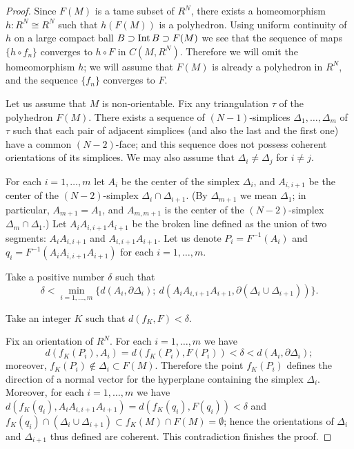 \documentclass[12pt]{article}
\theoremstyle{definition}
\begin{document}
\begin{proof}
Since $F(M)$ is a tame subset of $R^N$,
there exists a homeomorphism $h:R^N\cong R^N$
such that $h(F(M))$ is a polyhedron.
Using uniform
continuity
of $h$ on a large compact ball 
$B\supset \operatorname{Int} B \supset F(M)$
we see
that the sequence of maps
$\{h\circ f_n\}$ converges to
$h\circ F$ in $C(M, R^N)$.
Therefore we will omit the homeomorphism $h$;
we will assume that $F(M)$ is already a polyhedron in $R^N$,
and the sequence 
$\{ f_n\}$ converges to $F$.


Let us assume that $M$ is non-orientable.
Fix any triangulation $\tau $ of the polyhedron $F(M)$.
There exists a sequence
of $(N-1)$-simplices 
$\Delta _1 , \ldots , \Delta _m$
of $\tau $
such that
each pair of adjacent simplices
(and also the last and the first one)
have a common $(N-2)$-face;
and this sequence does not possess
coherent orientations of its simplices.
We may also assume that
$\Delta _i \neq\Delta _j$ for $i\neq j$.


For each $i=1,\ldots , m$ let $A_i$ be the center of the simplex $\Delta _i$, and
$A_{i,i+1}$ be the center of the $(N-2)$-simplex
$\Delta _i \cap \Delta _{i+1}$.
(By $\Delta _{m+1}$ we mean
$\Delta _1$;
in particular, $A_{m+1} = A_1$,
and $A_{m,m+1}$ is the center of
the $(N-2)$-simplex $\Delta _m\cap \Delta _1$.)
Let $A_iA_{i,i+1}A_{i+1}$ be
the broken line defined as the union
of two segments:
$A_iA_{i,i+1}$ and $A_{i,i+1}A_{i+1}$.
Let us denote
$P_i = F^{-1} (A_i)$ and
$q_i = F^{-1}(A_iA_{i,i+1}A_{i+1})$
for each $i=1,\ldots , m$.



Take a positive number $\delta $ such that 
$$
 \delta < \min_{i=1,\ldots , m}
\{
d(A_i, \partial \Delta _i);
\ 
d(
A_iA_{i,i+1}A_{i+1}, \partial (\Delta _i\cup 
\Delta _{i+1}) )
\} .
$$

Take an integer $K$ such that
$d(f_K,F)<\delta $.

Fix an orientation of $R^N$.
For each $i=1,\ldots , m$ we have
$$
d(f_K (P_i) , A_i) =
d(f_K (P_i) , F(P_i))  < \delta < 
d(A_i, \partial \Delta _i);
$$
moreover,
$f_K(P_i) \notin \Delta _i \subset F(M)$.
Therefore the point 
$f_K(P_i)$
defines the direction of a normal vector 
for the hyperplane containing
the simplex $\Delta _i$.
Moreover, for each $i=1,\ldots , m$
we have
$
d(f_K(q_i), A_iA_{i,i+1}A_{i+1}) = 
d(f_K(q_i) , F(q_i)) < \delta $
and
$f_K(q_i)\cap (\Delta _i\cup\Delta _{i+1})
\subset f_K (M)\cap F(M) = \emptyset $;
hence
the orientations of
$\Delta _i$ and $\Delta _{i+1}$ thus defined
are coherent.
This contradiction finishes the proof.
\end{proof}
\end{document}
